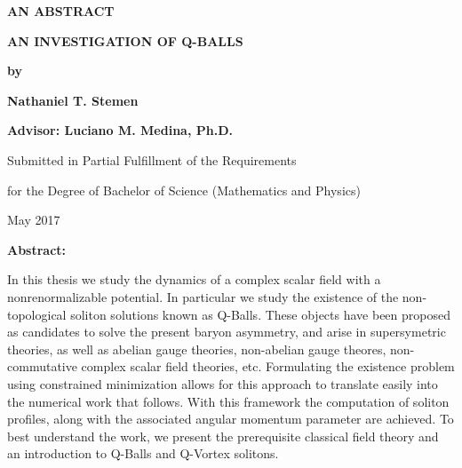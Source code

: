 \documentclass[12pt]{report}
\theoremstyle{definition}
\begin{document}
\begin{center}
    \begin{minipage}{\linewidth}
        \centering

        \textbf{AN ABSTRACT} \\ \vspace{1.cm}

        \textbf{AN INVESTIGATION OF Q-BALLS} \\ \vspace{0.5cm}

        \textbf{by} \\ \vspace{0.75cm}

        \textbf{Nathaniel T. Stemen} \\ \vspace{0.75cm}

        \textbf{Advisor: Luciano M. Medina, Ph.D.} \\ \vspace{1.cm}

        {Submitted in Partial Fulfillment of the Requirements} \\ \vspace{0.5cm}

        {for the Degree of Bachelor of Science (Mathematics and Physics)} \\ \vspace{1.cm}

        {May 2017} \\ \vspace{0.5cm}

        {\textbf{Abstract:}}

        {In this thesis we study the dynamics of a complex scalar field with a
            nonrenormalizable potential. In particular we study the existence of the
            non-topological soliton solutions known as Q-Balls. These objects have been
            proposed as candidates to solve the present baryon asymmetry, and arise in
            supersymetric theories, as well as abelian gauge theories, non-abelian gauge
            theores, non-commutative complex scalar field theories, etc. Formulating the
            existence problem using constrained minimization allows for this approach to
            translate easily into the numerical work that follows. With this framework
            the computation of soliton profiles, along with the associated angular
            momentum parameter are achieved. To best understand the work, we present the
            prerequisite classical field theory and an introduction to Q-Balls and
            Q-Vortex solitons.}
    \end{minipage}
\end{center}
\clearpage
\end{document}
